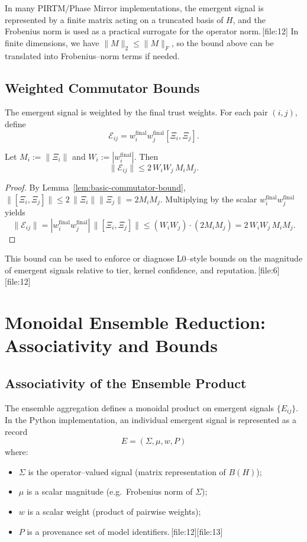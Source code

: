 \documentclass[11pt]{article}
\begin{document}
In many PIRTM/Phase Mirror implementations, the emergent signal is represented
by a finite matrix acting on a truncated basis of \(H\), and the Frobenius
norm is used as a practical surrogate for the operator norm.\,[file:12] In
finite dimensions, we have \(\|M\|_2 \le \|M\|_F\), so the bound above can be
translated into Frobenius--norm terms if needed.

\subsection{Weighted Commutator Bounds}

The emergent signal is weighted by the final trust weights. For each pair
\((i,j)\), define
\[
  \mathcal{E}_{ij} = w_i^{\mathrm{final}} w_j^{\mathrm{final}} [\Xi_i,\Xi_j].
\]

\begin{proposition}
\label{prop:weighted-bound}
Let \(M_i := \|\Xi_i\|\) and \(W_i := |w_i^{\mathrm{final}}|\). Then
\[
  \|\mathcal{E}_{ij}\| \le 2\,W_i W_j\,M_i M_j.
\]
\end{proposition}

\begin{proof}
By Lemma~\ref{lem:basic-commutator-bound},
\(\|[\Xi_i,\Xi_j]\| \le 2\,\|\Xi_i\|\|\Xi_j\| = 2 M_i M_j\). Multiplying by the
scalar \(w_i^{\mathrm{final}} w_j^{\mathrm{final}}\) yields
\[
  \|\mathcal{E}_{ij}\|
  = |w_i^{\mathrm{final}} w_j^{\mathrm{final}}|\,\|[\Xi_i,\Xi_j]\|
  \le (W_i W_j) \cdot (2 M_i M_j)
  = 2\,W_i W_j\,M_i M_j.
\]
\end{proof}

This bound can be used to enforce or diagnose L0--style bounds on the
magnitude of emergent signals relative to tier, kernel confidence, and
reputation.\,[file:6][file:12]

\section{Monoidal Ensemble Reduction: Associativity and Bounds}

\subsection{Associativity of the Ensemble Product}

The ensemble aggregation defines a monoidal product on emergent signals
\(\{E_{ij}\}\). In the Python implementation, an individual emergent signal is
represented as a record
\[
  E = (\Sigma, \mu, w, P)
\]
where:
\begin{itemize}[leftmargin=*]
  \item \(\Sigma\) is the operator--valued signal (matrix representation of
  \(B(H)\));
  \item \(\mu\) is a scalar magnitude (e.g.\ Frobenius norm of \(\Sigma\));
  \item \(w\) is a scalar weight (product of pairwise weights);
  \item \(P\) is a provenance set of model identifiers.\,[file:12][file:13]
\end{itemize}
\end{document}
